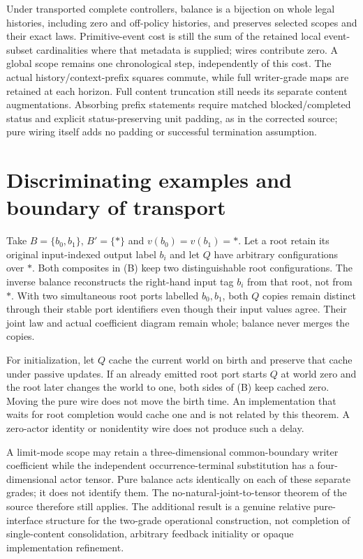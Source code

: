 \documentclass[11pt]{article}
\begin{document}
Under transported complete controllers, balance is a bijection on whole legal histories, including zero and off-policy histories, and preserves selected scopes and their exact laws. Primitive-event cost is still the sum of the retained local event-subset cardinalities where that metadata is supplied; wires contribute zero. A global scope remains one chronological step, independently of this cost. The actual history/context-prefix squares commute, while full writer-grade maps are retained at each horizon. Full content truncation still needs its separate content augmentations. Absorbing prefix statements require matched blocked/completed status and explicit status-preserving unit padding, as in the corrected source; pure wiring itself adds no padding or successful termination assumption.

\section{Discriminating examples and boundary of transport}
Take $B=\{b_0,b_1\}$, $B'=\{*\}$ and $v(b_0)=v(b_1)=*$. Let a root retain its original input-indexed output label $b_i$ and let $Q$ have arbitrary configurations over $*$. Both composites in (B) keep two distinguishable root configurations. The inverse balance reconstructs the right-hand input tag $b_i$ from that root, not from $*$. With two simultaneous root ports labelled $b_0,b_1$, both $Q$ copies remain distinct through their stable port identifiers even though their input values agree. Their joint law and actual coefficient diagram remain whole; balance never merges the copies.

For initialization, let $Q$ cache the current world on birth and preserve that cache under passive updates. If an already emitted root port starts $Q$ at world zero and the root later changes the world to one, both sides of (B) keep cached zero. Moving the pure wire does not move the birth time. An implementation that waits for root completion would cache one and is not related by this theorem. A zero-actor identity or nonidentity wire does not produce such a delay.

A limit-mode scope may retain a three-dimensional common-boundary writer coefficient while the independent occurrence-terminal substitution has a four-dimensional actor tensor. Pure balance acts identically on each of these separate grades; it does not identify them. The no-natural-joint-to-tensor theorem of the source therefore still applies. The additional result is a genuine relative pure-interface structure for the two-grade operational construction, not completion of single-content consolidation, arbitrary feedback initiality or opaque implementation refinement.
\end{document}
